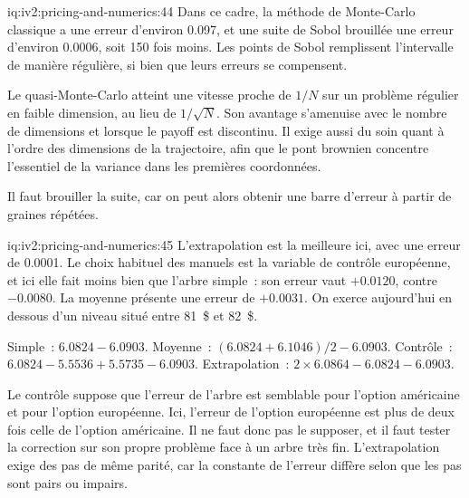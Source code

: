 \begin{solution}{iq:iv2:pricing-and-numerics:44}
Dans ce cadre, la méthode de Monte-Carlo classique a une erreur d'environ 0.097, et une suite de Sobol brouillée une erreur d'environ 0.0006, soit 150 fois moins. Les points de Sobol remplissent l'intervalle de manière régulière, si bien que leurs erreurs se compensent.

Le quasi-Monte-Carlo atteint une vitesse proche de $1/N$ sur un problème régulier en faible dimension, au lieu de $1/\sqrt N$. Son avantage s'amenuise avec le nombre de dimensions et lorsque le payoff est discontinu. Il exige aussi du soin quant à l'ordre des dimensions de la trajectoire, afin que le pont brownien concentre l'essentiel de la variance dans les premières coordonnées.

Il faut brouiller la suite, car on peut alors obtenir une barre d'erreur à partir de graines répétées.

\end{solution}

\begin{solution}{iq:iv2:pricing-and-numerics:45}
L'extrapolation est la meilleure ici, avec une erreur de 0.0001. Le choix habituel des manuels est la variable de contrôle européenne, et ici elle fait moins bien que l'arbre simple~: son erreur vaut $+0.0120$, contre $-0.0080$. La moyenne présente une erreur de $+0.0031$. On exerce aujourd'hui en dessous d'un niveau situé entre 81~\$ et 82~\$.

Simple~: $6.0824 - 6.0903$. Moyenne~: $(6.0824 + 6.1046)/2 - 6.0903$. Contrôle~: $6.0824 - 5.5536 + 5.5735 - 6.0903$. Extrapolation~: $2 \times 6.0864 - 6.0824 - 6.0903$.

Le contrôle suppose que l'erreur de l'arbre est semblable pour l'option américaine et pour l'option européenne. Ici, l'erreur de l'option européenne est plus de deux fois celle de l'option américaine. Il ne faut donc pas le supposer, et il faut tester la correction sur son propre problème face à un arbre très fin. L'extrapolation exige des pas de même parité, car la constante de l'erreur diffère selon que les pas sont pairs ou impairs.

\end{solution}

